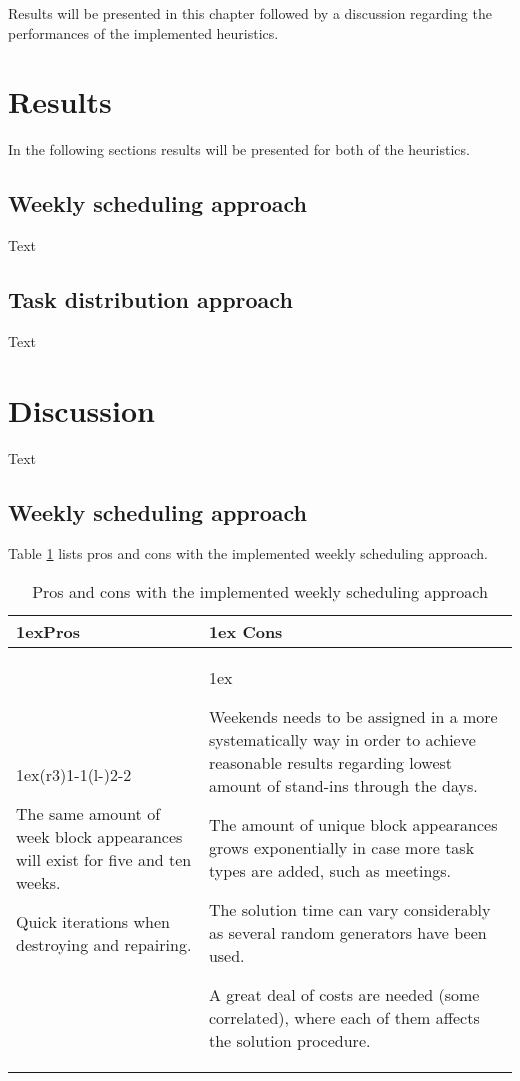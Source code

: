 Results will be presented in this chapter followed by a discussion regarding the performances of the implemented heuristics. 

\section{Results}
In the following sections results will be presented for both of the heuristics.

\subsection{Weekly scheduling approach}
Text



\subsection{Task distribution approach}
Text


\section{Discussion}
Text


\subsection{Weekly scheduling approach}
Table \ref{pros_cons_weekly_scheduling} lists pros and cons with the implemented weekly scheduling approach.
\begin{table}[!h]
\caption{Pros and cons with the implemented weekly scheduling approach}
\label{pros_cons_weekly_scheduling}
\begin{tabularx}{\linewidth}{>{\parskip1ex}X@{\kern4\tabcolsep}>{\parskip1ex}X}
\toprule
\hfil\bfseries Pros
&
\hfil\bfseries Cons
\\\cmidrule(r{3\tabcolsep}){1-1}\cmidrule(l{-\tabcolsep}){2-2}

The same amount of week block appearances will exist for five and ten weeks.\par
Quick iterations when destroying and repairing.\par

&

Weekends needs to be assigned in a more systematically way in order to achieve reasonable results regarding lowest amount of stand-ins through the days.\par
The amount of unique block appearances grows exponentially in case more task types are added, such as meetings.\par
The solution time can vary considerably as several random generators have been used.\par
A great deal of costs are needed (some correlated), where each of them affects the solution procedure.

\\\bottomrule
\end{tabularx}
\end{table}

